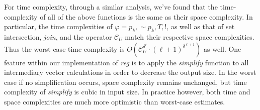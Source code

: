 \documentclass[runningheads]{llncs}
\renewcommand{\phi}{\varphi}
\begin{document}
For time complexity, through a similar analysis, we've found that the time-complexity of all of the above functions is the same as their space complexity. In particular, the time complexities of $\phi = p_k, \scriptstyle{\sim}\textstyle p_k, T, !$, as well as that of set intersection, \textit{join}, and the operator $\mathcal{C}_U$ match their respective space complexities. Thus the worst case time complexity is $O(\mathcal{C}_U^{\delta ^ \ell} \cdot (\ell + 1)^{\delta^{\ell + 1}})$ as well. 
One feature within our implementation of \textit{reg} is to apply the \textit{simplify} function to all intermediary vector calculations in order to decrease the output size. In the worst case if no simplification occurs, space complexity remains unchanged, but time complexity of \textit{simplify} is cubic in input size. In practice however, both time and space complexities are much more optimistic than worst-case estimates. 
 
\end{document}
